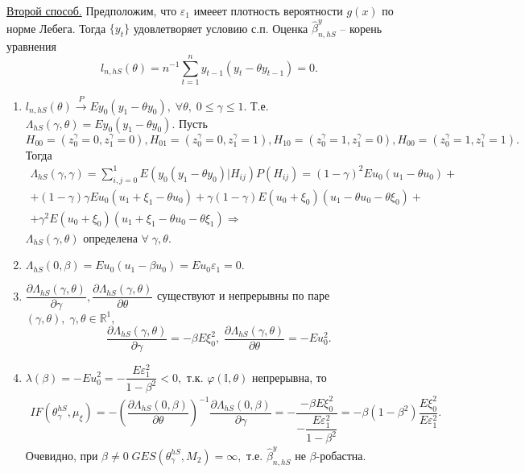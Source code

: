 \underline{Второй способ.} Предположим, что $\varepsilon_1$ имееет плотность вероятности $g(x)$ по норме Лебега. Тогда $\lbrace y_t \rbrace$ удовлетворяет условию с.п. Оценка $\hat{\beta}_{n, hS}^y $ -- корень уравнения 
$$l_{n, hS}(\theta) = n^{-1}\sum\limits_{t = 1}^n y_{t - 1}(y_t - \theta y_{t - 1}) = 0.$$
\begin{enumerate}
    \item $l_{n, hS}(\theta) \stackrel{P}{\to} Ey_0 (y_1 - \theta y_0), \; \forall \theta, \; 0 \leq \gamma \leq 1.$
    Т.е. $\Lambda_{hS}(\gamma, \theta) = Ey_0(y_1 - \theta y_0).$ Пусть $H_{00} = (z_0^{\gamma} = 0, z_1^{\gamma} = 0), H_{01} = (z_0^{\gamma} = 0, z_1^{\gamma} = 1), H_{10} = (z_0^{\gamma} = 1, z_1^{\gamma} = 0), H_{00} = (z_0^{\gamma} = 1, z_1^{\gamma} = 1).$ Тогда
    $$\begin{gathered}
        \Lambda_{hS}(\gamma, \gamma) = \sum\limits_{i,j = 0}^1E(y_0(y_1 - \theta y_0)| H_{ij})P(H_{ij}) = (1 - \gamma)^2Eu_0(u_1 - \theta u_0) +\\
        + (1 - \gamma)\gamma Eu_0(u_1 + \xi_1 - \theta u_0) + \gamma (1 - \gamma)E(u_0 + \xi_0)(u_1 - \theta u_0 - \theta \xi_0) +\\
        + \gamma^2 E(u_0 + \xi_0)(u_1 + \xi_1 - \theta u_0 - \theta \xi_1) \Longrightarrow
    \end{gathered}$$
    $\Lambda_{hS}(\gamma, \theta)$ определена $\forall \; \gamma, \theta.$
    \item $\Lambda_{hS}(0, \beta) = Eu_0(u_1 - \beta u_0) = Eu_0\varepsilon_1 = 0.$
    \item $\dfrac{\partial \Lambda_{hS}(\gamma, \theta)}{\partial \gamma}, \dfrac{\partial \Lambda_{hS}(\gamma, \theta)}{\partial \theta}$ существуют и непрерывны по паре $(\gamma, \theta), \; \gamma, \theta \in \mathbb{R}^1,$
    $$\dfrac{\partial \Lambda_{hS}(\gamma, \theta)}{\partial \gamma} = -\beta E\xi_0^2, \; \dfrac{\partial \Lambda_{hS}(\gamma, \theta)}{\partial \theta} = -Eu_0^2.$$
    \item $\lambda(\beta) = -Eu_0^2 = -\dfrac{E\varepsilon_1^2}{1 - \beta^2} < 0,$ т.к. $\varphi(\mathbb{I}, \theta)$ непрерывна, то
    $$\begin{gathered}
        IF(\theta_{\gamma}^{hS}, \mu_{\xi}) = -(\dfrac{\partial \Lambda_{hS}(0, \beta)}{\partial \theta})^{-1}\dfrac{\partial \Lambda_{hS}(0, \beta)}{\partial \gamma} = -\dfrac{-\beta E\xi_0^2}{-\dfrac{E\varepsilon_1^2}{1 - \beta^2}} = -\beta(1 - \beta^2)\dfrac{E\xi_0^2}{E\varepsilon_1^2}.
    \end{gathered}$$
    Очевидно, при $\beta \neq 0 \; GES(\theta_{\gamma}^{hS}, M_2) = \infty, $ т.е. $\hat{\beta}_{n, hS}^y$ не $\beta$-робастна.
\end{enumerate}

